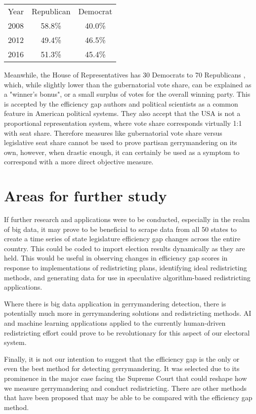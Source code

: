 \documentclass[sigconf]{acmart}
\begin{document}
\begin{center}
    \begin{tabular}{ |c|c|c| }
    \hline
    Year & Republican & Democrat \\
    2008 & 58.8\%  & 40.0\% \\
    2012 & 49.4\% & 46.5\% \\
    2016 & 51.3\% & 45.4\% \\
    \hline
    \end{tabular}
\end{center}
\cite{sos}
Meanwhile, the House of Representatives has 30 Democrats to 70 Republicans \cite{houseresults}, which, while slightly lower than the gubernatorial vote share, can be explained as a "winner's bonus", or a small surplus of votes for the overall winning party. This is accepted by the efficiency gap authors and political scientists as a common feature in American political systems. They also accept that the USA is not a proportional representation system, where vote share corresponds virtually 1:1 with seat share.\cite{chicagoformula} Therefore measures like gubernatorial vote share versus legislative seat share cannot be used to prove partisan gerrymandering on its own, however, when drastic enough, it can certainly be used as a symptom to correspond with a more direct objective measure.

\section{Areas for further study}
If further research and applications were to be conducted, especially in the realm of big data, it may prove to be beneficial to scrape data from all 50 states to create a time series of state legislature efficiency gap changes across the entire country. This could be coded to import election results dynamically as they are held. This would be useful in observing changes in efficiency gap scores in response to implementations of redistricting plans, identifying ideal redistricting methods, and generating data for use in speculative algorithm-based redistricting applications.

Where there is big data application in gerrymandering detection, there is potentially much more in gerrymandering solutions and redistricting methods. AI and machine learning applications applied to the currently human-driven redistricting effort could prove to be revolutionary for this aspect of our electoral system. 

Finally, it is not our intention to suggest that the efficiency gap is the only or even the best method for detecting gerrymandering. It was selected due to its prominence in the major case facing the Supreme Court that could reshape how we measure gerrymandering and conduct redistricting. There are other methods\cite{levin}\cite{warrington} that have been proposed that may be able to be compared with the efficiency gap method.
\end{document}
